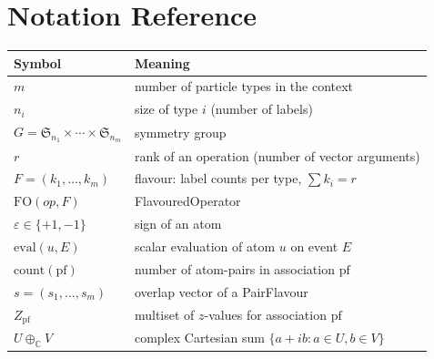 \documentclass[11pt,a4paper]{article}
\theoremstyle{definition}
\theoremstyle{plain}
\theoremstyle{remark}
\newcommand{\C}{\mathbb{C}}
\newcommand{\Sym}{\mathfrak{S}}
\newcommand{\eval}{\mathrm{eval}}
\newcommand{\fo}{\mathrm{FO}}
\newcommand{\pf}{\mathrm{pf}}
\newcommand{\acount}{\mathrm{count}}
\begin{document}
\appendix
\section{Notation Reference}

\begin{center}
\renewcommand{\arraystretch}{1.4}
\begin{tabular}{ll}
  \toprule
  \textbf{Symbol} & \textbf{Meaning} \\
  \midrule
  $m$ & number of particle types in the context \\
  $n_i$ & size of type $i$ (number of labels) \\
  $G = \Sym_{n_1}\times\cdots\times\Sym_{n_m}$ & symmetry group \\
  $r$ & rank of an operation (number of vector arguments) \\
  $F = (k_1,\ldots,k_m)$ & flavour: label counts per type, $\sum k_i = r$ \\
  $\fo(\mathit{op}, F)$ & FlavouredOperator \\
  $\varepsilon \in \{+1,-1\}$ & sign of an atom \\
  $\eval(u, E)$ & scalar evaluation of atom $u$ on event $E$ \\
  $\acount(\pf)$ & number of atom-pairs in association $\pf$ \\
  $s = (s_1,\ldots,s_m)$ & overlap vector of a PairFlavour \\
  $Z_\pf$ & multiset of $z$-values for association $\pf$ \\
  $U \oplus_\C V$ & complex Cartesian sum $\{a+ib : a\in U, b\in V\}$ \\
  \bottomrule
\end{tabular}
\end{center}
\end{document}
